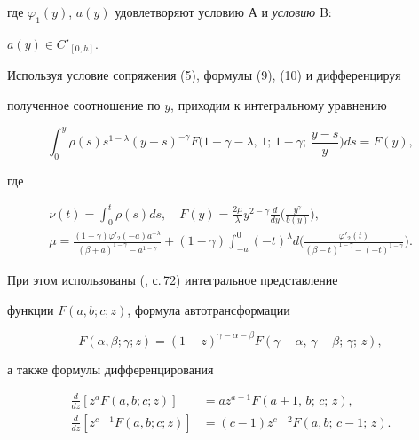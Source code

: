 где $\varphi_1(y)$, $a(y)$ удовлетворяют условию А и {\it условию} B: 


$a(y)\in C'_{[0,h]}$. 


 


Используя условие сопряжения (5), формулы (9), (10) и дифференцируя 


полученное соотношение по $y$, приходим к интегральному уравнению 


\begin{equation} 


\int^y_0 \rho(s)s^{1-\lambda}(y-s)^{-\gamma} 


F\bigg(1-\gamma-\lambda,\,1;\,1-\gamma;\, 


\frac{y-s}{y}\bigg)ds=F(y), 


\end{equation} 


где 


\begin{gather*} 


\nu(t)=\int^t_0 \rho(s)ds,\quad F(y)=\frac{2\mu}{\lambda} 


y^{2-\gamma}\frac{d}{dy}\bigg(\frac{y^\gamma}{b(y)}\bigg),\\ 


\mu=\frac{(1-\gamma)\varphi'_2(-a)a^{-\lambda}} 


{(\beta+a)^{1-\gamma}-a^{1-\gamma}}+(1-\gamma) 


\int^0_{-a}(-t)^\lambda d\bigg( 


\frac{\varphi'_2(t)}{(\beta-t)^{1-\gamma}-(-t)^{1-\gamma}}\bigg). 


\end{gather*} 


При этом использованы (\cite{2}, с.\,72) интегральное представление 


функции $F(a,b;c;z)$, формула автотрансформации 


$$ 


F(\alpha,\beta;\gamma;z)=(1-z)^{\gamma-\alpha-\beta} 


F(\gamma-\alpha,\,\gamma-\beta;\,\gamma;\,z), 


$$ 


а также формулы дифференцирования 


\begin{align*} 


\frac{d}{dz}[z^a F(a,b;c;z)]&=a z^{a-1} 


F(a+1,\,b;\,c;\,z),\\ 


\frac{d}{dz}[z^{c-1}F(a,b;c;z)]&=(c-1)z^{c-2} 


F(a,b;\,c-1;\,z). 


\end{align*} 


